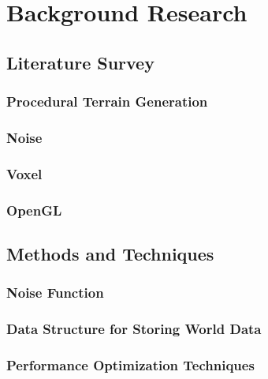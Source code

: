 \chapter{Background Research}
\label{chapter2}

\section{Literature Survey}

\subsection{Procedural Terrain Generation}

\subsection{Noise}

\subsection{Voxel}

\subsection{OpenGL}

\section{Methods and Techniques}

\subsection{Noise Function}

\subsection{Data Structure for Storing World Data}

\subsection{Performance Optimization Techniques} 

